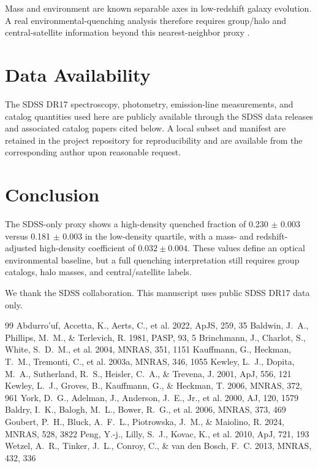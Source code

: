 \documentclass[twocolumn]{aastex631}
\begin{document}
Mass and environment are known separable axes in low-redshift galaxy evolution. A real environmental-quenching analysis therefore requires group/halo and central-satellite information beyond this nearest-neighbor proxy \citep{peng2010, baldry2006, wetzel2013, goubert2024}.


\section{Data Availability}\label{sec:data-avail}
The SDSS DR17 spectroscopy, photometry, emission-line measurements, and catalog quantities used here are publicly available through the SDSS data releases and associated catalog papers cited below. A local subset and manifest are retained in the project repository for reproducibility and are available from the corresponding author upon reasonable request.

\section{Conclusion}\label{sec:conclusion}
The SDSS-only proxy shows a high-density quenched fraction of 0.230 $\pm$ 0.003 versus 0.181 $\pm$ 0.003 in the low-density quartile, with a mass- and redshift-adjusted high-density coefficient of $0.032 \pm 0.004$. These values define an optical environmental baseline, but a full quenching interpretation still requires group catalogs, halo masses, and central/satellite labels.

\begin{acknowledgments}
We thank the SDSS collaboration. This manuscript uses public SDSS DR17 data only.
\end{acknowledgments}


\begin{thebibliography}{99}
 Abdurro'uf, Accetta, K., Aerts, C., et al. 2022, ApJS, 259, 35
 Baldwin, J.~A., Phillips, M.~M., \& Terlevich, R. 1981, PASP, 93, 5
 Brinchmann, J., Charlot, S., White, S.~D.~M., et al. 2004, MNRAS, 351, 1151
 Kauffmann, G., Heckman, T.~M., Tremonti, C., et al. 2003a, MNRAS, 346, 1055
 Kewley, L.~J., Dopita, M.~A., Sutherland, R.~S., Heisler, C.~A., \& Trevena, J. 2001, ApJ, 556, 121
 Kewley, L.~J., Groves, B., Kauffmann, G., \& Heckman, T. 2006, MNRAS, 372, 961
 York, D.~G., Adelman, J., Anderson, J.~E., Jr., et al. 2000, AJ, 120, 1579
 Baldry, I.~K., Balogh, M.~L., Bower, R.~G., et al. 2006, MNRAS, 373, 469
 Goubert, P.~H., Bluck, A.~F.~L., Piotrowska, J.~M., \& Maiolino, R. 2024, MNRAS, 528, 3822
 Peng, Y.-j., Lilly, S.~J., Kovac, K., et al. 2010, ApJ, 721, 193
 Wetzel, A.~R., Tinker, J.~L., Conroy, C., \& van den Bosch, F.~C. 2013, MNRAS, 432, 336
\end{thebibliography}
\end{document}
